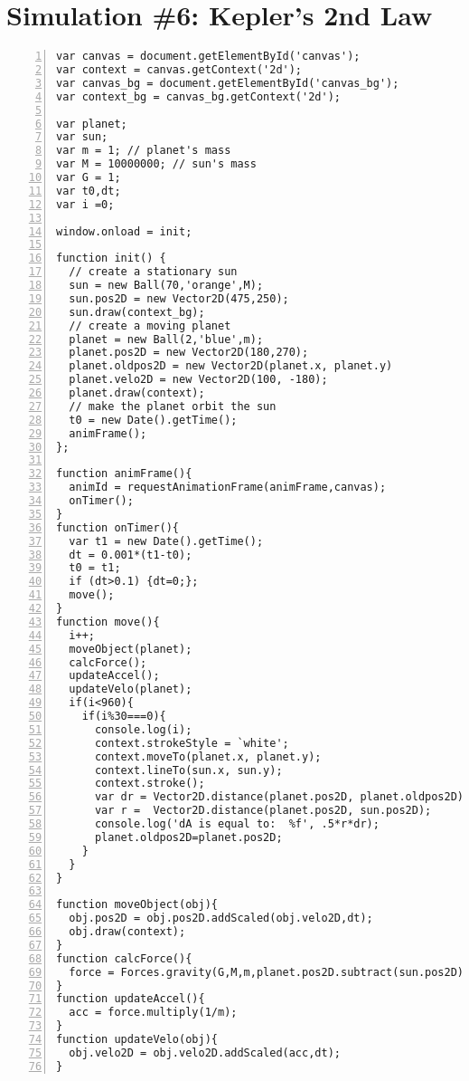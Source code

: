 \section{Simulation \#6:  Kepler's 2nd Law}
\begin{lstlisting}[breaklines=true, frame=single, numbers=left, caption=Kepler's 2nd Law Simulation]
var canvas = document.getElementById('canvas');
var context = canvas.getContext('2d'); 
var canvas_bg = document.getElementById('canvas_bg');
var context_bg = canvas_bg.getContext('2d');

var planet;
var sun;
var m = 1; // planet's mass
var M = 10000000; // sun's mass
var G = 1;
var t0,dt;
var i =0;

window.onload = init; 

function init() {
  // create a stationary sun
  sun = new Ball(70,'orange',M);
  sun.pos2D = new Vector2D(475,250);  
  sun.draw(context_bg);
  // create a moving planet     
  planet = new Ball(2,'blue',m);
  planet.pos2D = new Vector2D(180,270);
  planet.oldpos2D = new Vector2D(planet.x, planet.y)
  planet.velo2D = new Vector2D(100, -180);
  planet.draw(context);
  // make the planet orbit the sun
  t0 = new Date().getTime(); 
  animFrame();
};

function animFrame(){
  animId = requestAnimationFrame(animFrame,canvas);
  onTimer(); 
}
function onTimer(){
  var t1 = new Date().getTime(); 
  dt = 0.001*(t1-t0); 
  t0 = t1;  
  if (dt>0.1) {dt=0;};  
  move();
}
function move(){    
  i++;
  moveObject(planet);
  calcForce();
  updateAccel();
  updateVelo(planet);
  if(i<960){
    if(i%30===0){
      console.log(i);
      context.strokeStyle = `white';
      context.moveTo(planet.x, planet.y);
      context.lineTo(sun.x, sun.y);
      context.stroke();
      var dr = Vector2D.distance(planet.pos2D, planet.oldpos2D);
      var r =  Vector2D.distance(planet.pos2D, sun.pos2D);
      console.log('dA is equal to:  %f', .5*r*dr);
      planet.oldpos2D=planet.pos2D;
    }
  }
}

function moveObject(obj){
  obj.pos2D = obj.pos2D.addScaled(obj.velo2D,dt); 
  obj.draw(context);  
}
function calcForce(){
  force = Forces.gravity(G,M,m,planet.pos2D.subtract(sun.pos2D)); 
} 
function updateAccel(){
  acc = force.multiply(1/m);
} 
function updateVelo(obj){
  obj.velo2D = obj.velo2D.addScaled(acc,dt);        
}
\end{lstlisting}

